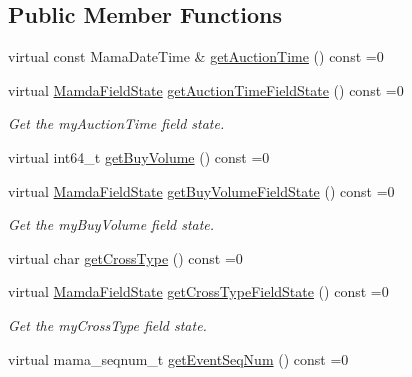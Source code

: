 \subsection*{Public Member Functions}
\begin{CompactItemize}
\item 
virtual const Mama\-Date\-Time \& \hyperlink{classWombat_1_1MamdaOrderImbalanceUpdate_b6d90b7fe1040ca61150eaa4a563b1bc}{get\-Auction\-Time} () const =0
\item 
virtual \hyperlink{namespaceWombat_93aac974f2ab713554fd12a1fa3b7d2a}{Mamda\-Field\-State} \hyperlink{classWombat_1_1MamdaOrderImbalanceUpdate_9ac67d6cd236c9fdecd04e9981ff2682}{get\-Auction\-Time\-Field\-State} () const =0
\begin{CompactList}\small\item\em Get the my\-Auction\-Time field state. \item\end{CompactList}\item 
virtual int64\_\-t \hyperlink{classWombat_1_1MamdaOrderImbalanceUpdate_cbe7dfec973260c56da5da281bcdcac4}{get\-Buy\-Volume} () const =0
\item 
virtual \hyperlink{namespaceWombat_93aac974f2ab713554fd12a1fa3b7d2a}{Mamda\-Field\-State} \hyperlink{classWombat_1_1MamdaOrderImbalanceUpdate_54acb8ab3f7eea4c35f2b6d411cc839f}{get\-Buy\-Volume\-Field\-State} () const =0
\begin{CompactList}\small\item\em Get the my\-Buy\-Volume field state. \item\end{CompactList}\item 
virtual char \hyperlink{classWombat_1_1MamdaOrderImbalanceUpdate_3c8f3b9f44661b8ca22f58fe039aa284}{get\-Cross\-Type} () const =0
\item 
virtual \hyperlink{namespaceWombat_93aac974f2ab713554fd12a1fa3b7d2a}{Mamda\-Field\-State} \hyperlink{classWombat_1_1MamdaOrderImbalanceUpdate_4eb6eaad6b33254dd361309e26299e3e}{get\-Cross\-Type\-Field\-State} () const =0
\begin{CompactList}\small\item\em Get the my\-Cross\-Type field state. \item\end{CompactList}\item 
virtual mama\_\-seqnum\_\-t \hyperlink{classWombat_1_1MamdaOrderImbalanceUpdate_f0ea246f8936ce1fa502a9972486c1ec}{get\-Event\-Seq\-Num} () const =0
\item 

\end{CompactItemize}
